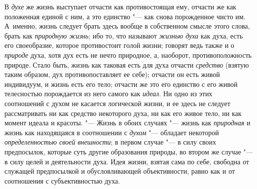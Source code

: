 {{В {\em духе}
же жизнь выступает отчасти как противостоящая ему, отчасти же
как положенная единой с ним, а это единство "--- как снова
порожденное чисто им. А~именно, жизнь следует брать здесь вообще в
собственном смысле этого слова, брать как
{\em природную жизнь};
ибо то, что называют
{\em жизнью духа} как
духа, есть его своеобразие, которое противостоит голой жизни; говорят ведь
также и о {\em природе}
духа, хотя дух есть не нечто природное, а, наоборот,
противоположность природе. Стало быть, жизнь как таковая есть для духа
отчасти {\em средство}
(взятую таким образом, дух противопоставляет ее себе);
отчасти он есть живой индивидуум, и жизнь есть его тело; отчасти же это его
единство с его живой телесностью порождается из него самого как
{\em идеал}. Ни одно из
этих соотношений с духом не касается логической жизни, и ее здесь не
следует рассматривать ни как средство некоторого духа, ни как его живое
тело, ни как момент идеала и красоты. "--- Жизнь в обоих
случаях "--- жизнь как
{\em природная} и жизнь
как находящаяся в соотношении с
{\em духом} "--- обладает
некоторой {\em определенностью своей
внешности}; в первом случае "--- в силу своих
предпосылок, которые суть другие образования природы, во втором же случае
"--- в силу целей и деятельности духа. Идея жизни, взятая сама
по себе, свободна от служащей предпосылкой и обусловливающей объективности,
равно как и от соотношения с субъективностью духа.

}}
